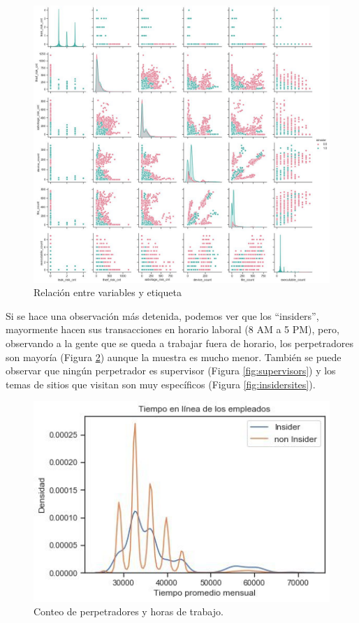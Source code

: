 \documentclass[runningheads]{llncs}
\begin{document}
\begin{figure}[h]
    \centering
    \includegraphics[width=1\textwidth]{imagenes/PairPlot.PNG}
    \caption{Relación entre variables y etiqueta}
    \label{fig:pairPlot}
\end{figure}

Si se hace una observación más detenida, podemos ver que los ``insiders'', mayormente hacen sus transacciones en horario laboral (8 AM a 5 PM), pero, observando a la gente que se queda a trabajar fuera de horario, los perpetradores son mayoría (Figura \ref{fig:inisiderHours}) aunque la muestra es mucho menor. También se puede observar que ningún perpetrador es supervisor (Figura \ref{fig:supervisors}) y los temas de sitios que visitan son muy específicos (Figura \ref{fig:insidersites}).

\begin{figure}
    \centering
    \includegraphics[width = 1\textwidth]{imagenes/InsiderHours.PNG}
    \caption{Conteo de perpetradores y horas de trabajo.}
    \label{fig:inisiderHours}
\end{figure}
\end{document}
